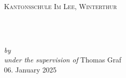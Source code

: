 \begin{titlepage}
    \vspace*{5cm}
    \makeatletter
    \begin{center}
      \textsc{Kantonsschule Im Lee, Winterthur}\\
      \vspace*{1cm}
      \begin{Huge}
        \@title
      \end{Huge}\\[0.1cm]
      \begin{Large}
        \@subtitle
      \end{Large}\\
      \emph{by}
      \@author\\
      \emph{under the supervision of}
      Thomas Graf\\
      \vfill
      06. January 2025
    \end{center}
    \makeatother
\end{titlepage}
  
\newpage
\null
\thispagestyle{empty}
\newpage
  
